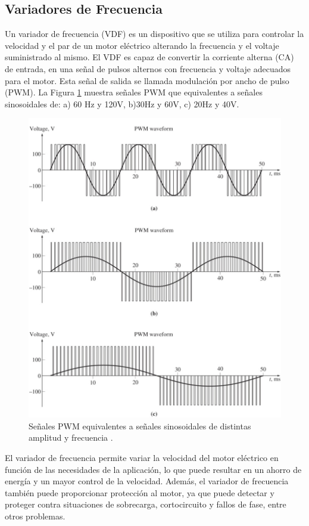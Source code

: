 \subsection{Variadores de Frecuencia}

Un variador de frecuencia (VDF) es un dispositivo que se utiliza para controlar la velocidad y el par de un motor eléctrico alterando la frecuencia y el voltaje suministrado al mismo. El VDF es capaz de convertir la corriente alterna (CA) de entrada, en una señal de pulsos alternos con frecuencia y voltaje adecuados para el motor. Esta señal de salida se llamada modulación por ancho de pulso (PWM). La Figura \ref{fig:pwm} muestra señales PWM que equivalentes a señales sinosoidales de: a) 60 Hz y 120V, b)30Hz y 60V, c) 20Hz y 40V.

\begin{figure}
	\centering
	\includegraphics[width=0.8\linewidth]{fig/pwm2}
	\caption{Señales PWM equivalentes a señales sinosoidales de distintas amplitud y frecuencia \cite{Chapman12}.}
	\label{fig:pwm}
\end{figure}


El variador de frecuencia permite variar la velocidad del motor eléctrico en función de las necesidades de la aplicación, lo que puede resultar en un ahorro de energía y un mayor control de la velocidad. Además, el variador de frecuencia también puede proporcionar protección al motor, ya que puede detectar y proteger contra situaciones de sobrecarga, cortocircuito y fallos de fase, entre otros problemas.

